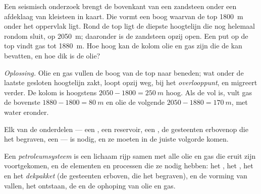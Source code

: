\begin{example}\label{ex:g11:fossil-fuel-geology:anticline}
Een seismisch onderzoek brengt de bovenkant van een zandsteen onder een afdeklaag van kleisteen in kaart. Die vormt een
boog waarvan de top \qty{1800}{m} onder het oppervlak ligt. Rond de top ligt de
diepste hoogtelijn die nog helemaal rondom sluit, op
\qty{2050}{m}; daaronder is de zandsteen opzij open. Een put op de top
vindt gas tot \qty{1880}{m}. Hoe hoog kan de kolom olie en gas zijn die de
 kan bevatten, en hoe dik is de olie?

\emph{Oplossing.} Olie en gas vullen de boog van de top naar beneden; wat
onder de laatste gesloten hoogtelijn zakt, loopt opzij weg, bij het
\emph{overlooppunt}, en migreert verder. De kolom is hoogstens
$2050 - 1800 = \qty{250}{m}$ hoog. Als de  vol is, vult gas de bovenste
$1880 - 1800 = \qty{80}{m}$ en olie de volgende $2050 - 1880 = \qty{170}{m}$,
met water eronder.
\end{example}

Elk van de onderdelen --- een , een reservoir, een , de gesteenten erbovenop
die het  begraven, een  --- is nodig, en ze moeten in de
juiste volgorde komen.

\begin{definition}[Petroleumsysteem]\label{def:g11:fossil-fuel-geology:petroleum-system}
Een \emph{petroleumsysteem} is een lichaam rijp 
samen met alle olie en gas die eruit zijn voortgekomen, en de elementen
en processen die ze nodig hebben: het , het , het  en
het \emph{dekpakket} (de gesteenten erboven, die het
 begraven), en de vorming van vallen, het ontstaan, de  en de
ophoping van olie en gas.
\end{definition}

